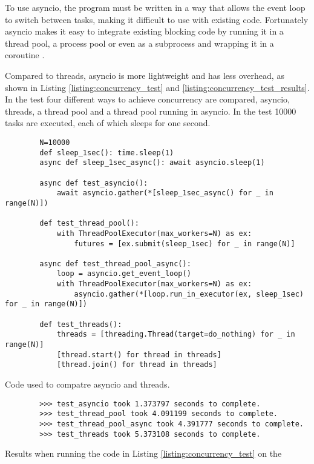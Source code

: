 To use \gls{asyncio}, the program must be written in a way that allows the event loop to switch between tasks, making it difficult to use with existing code.
Fortunately \gls{asyncio} makes it easy to integrate existing blocking code by running it in a thread pool, a process pool or even as a subprocess and wrapping it in a coroutine \cite{pythonsoftwarefoundationAsyncioAsynchronous}.

Compared to threads, \gls{asyncio} is more lightweight and has less overhead, as shown in Listing \ref{listing:concurrency_test} and \ref{listing:concurrency_test_results}.
In the test four different ways to achieve concurrency are compared, \gls{asyncio}, threads, a thread pool and a thread pool running in \gls{asyncio}.
In the test 10000 tasks are executed, each of which sleeps for one second.

\begin{listing}[H]
    \begin{verbatim}
        N=10000
        def sleep_1sec(): time.sleep(1)
        async def sleep_1sec_async(): await asyncio.sleep(1)

        async def test_asyncio():
            await asyncio.gather(*[sleep_1sec_async() for _ in range(N)])

        def test_thread_pool():
            with ThreadPoolExecutor(max_workers=N) as ex:
                futures = [ex.submit(sleep_1sec) for _ in range(N)]

        async def test_thread_pool_async():
            loop = asyncio.get_event_loop()
            with ThreadPoolExecutor(max_workers=N) as ex:
                asyncio.gather(*[loop.run_in_executor(ex, sleep_1sec) for _ in range(N)])

        def test_threads():
            threads = [threading.Thread(target=do_nothing) for _ in range(N)]
            [thread.start() for thread in threads]
            [thread.join() for thread in threads]
    \end{verbatim}
    \caption{Code used to compatre asyncio and threads.}
    \label{listing:concurrency_test}
\end{listing}
\begin{listing}[H]
    \begin{verbatim}
        >>> test_asyncio took 1.373797 seconds to complete.
        >>> test_thread_pool took 4.091199 seconds to complete.
        >>> test_thread_pool_async took 4.391777 seconds to complete.
        >>> test_threads took 5.373108 seconds to complete.
    \end{verbatim}
    \caption{Results when running the code in Listing  \ref{listing:concurrency_test} on the \jx}
    \label{listing:concurrency_test_results}
\end{listing}


